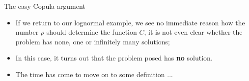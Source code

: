 \documentclass[11pt]{beamer}
\theoremstyle{plain}
\theoremstyle{definition}
\theoremstyle{remark}
\begin{document}
%
\begin{frame}{The easy Copula argument}
   \begin{itemize}
      \item  If we return to our lognormal example, we see no immediate reason how the number $\rho$ should determine the function $C$, 
      it is not even clear whether the problem has none, one or infinitely many solutions;
      \item In this case, it turns out that the problem posed has \textbf{no} solution.  				  						  
      \item The time has come to move on to some definition ... 
   \end{itemize}
\end{frame}
\end{document}
